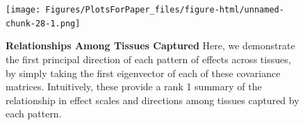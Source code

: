 \begin{figure}[htbp]
\texttt{[image: Figures/PlotsForPaper\_files/figure-html/unnamed-chunk-28-1.png]}
\caption{\textbf{Relationships Among Tissues Captured} Here, we demonstrate the first principal direction of each pattern of effects across tissues, by simply taking the first eigenvector of each of these covariance matrices. Intuitively, these provide a rank 1 summary of the relationship in effect scales and directions among tissues captured by each pattern.}
\label{fig:pcplot}
\end{figure}\newline

%

